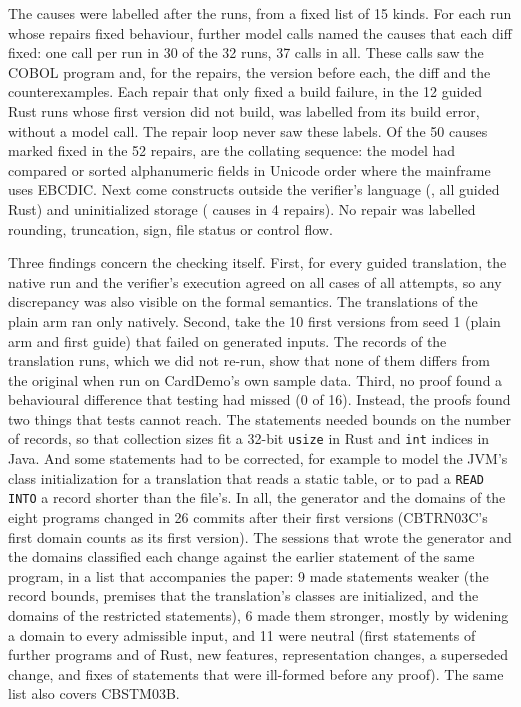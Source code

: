 The causes were labelled after the runs, from a fixed list of 15 kinds. For each run whose repairs fixed behaviour, further model calls named the causes that each diff fixed: one call per
run in 30 of the 32 runs, 37 calls in all. These calls saw the COBOL program and, for the repairs, the version before
each, the diff and the counterexamples. Each repair that only fixed a build failure, in the 12 guided Rust runs whose first version did
not build, was labelled from its build error, without a model call. The repair loop never saw these labels.
Of the 50 causes marked fixed in the 52 repairs, \aaCollating{} are the collating sequence: the model had compared or
sorted alphanumeric fields in Unicode order where the mainframe uses EBCDIC. Next come constructs outside
the verifier's language (\aaVerifLang{}, all guided Rust) and uninitialized storage (\aaUninit{} causes in 4 repairs). No repair was
labelled rounding, truncation, sign, file status or control flow.

Three findings concern the checking itself. First, for every guided translation, the native run and the verifier's execution agreed on all cases of all attempts, so any discrepancy was also visible on the formal semantics. The translations of
the plain arm ran only natively. Second, take the 10 first versions from seed 1 (plain arm and first guide) that failed on generated inputs. The
records of the translation runs, which we did not re-run, show that none of them differs from the original when run on
CardDemo's own sample data. Third, no proof found a behavioural difference that testing had missed (0 of 16). Instead, the proofs found two things that tests cannot reach. The statements needed
bounds on the number of records, so that collection sizes fit a 32-bit \texttt{usize} in Rust and \texttt{int}
indices in Java. And some statements had to be corrected, for example to model the JVM's class initialization for a
translation that reads a static table, or to pad a \texttt{READ INTO} a record shorter than the file's. In all, the
generator and the domains of the eight programs changed in 26 commits after their first versions (CBTRN03C's first
domain counts as its first version). The sessions that wrote the generator and the domains classified each change against the earlier
statement of the same program, in a list that accompanies the paper: 9 made statements
weaker (the record bounds, premises that the translation's classes are initialized, and the domains of the restricted
statements), 6 made them stronger, mostly by widening a domain to every admissible input, and 11 were neutral (first
statements of further programs and of Rust, new features, representation changes, a superseded change, and fixes of
statements that were ill-formed before any proof). The same list also covers CBSTM03B.

